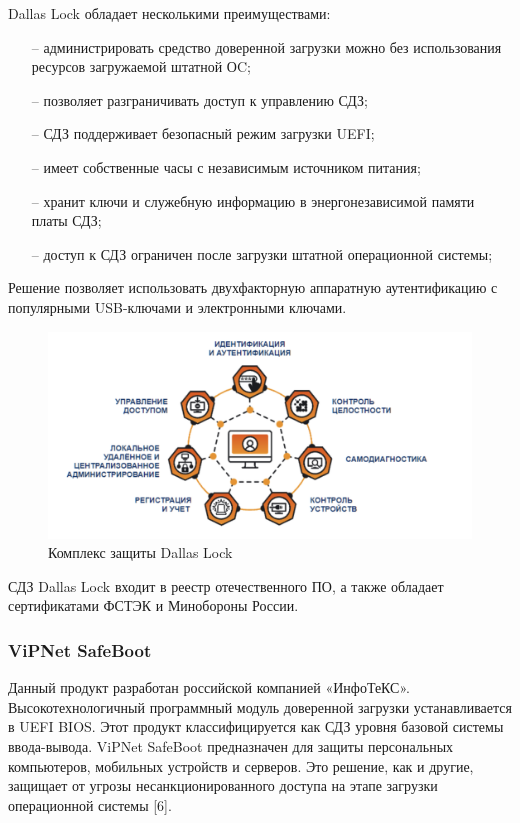 Dallas Lock обладает несколькими преимуществами:
\begin{itemize}
  \item[--] администрировать средство доверенной загрузки можно без использования ресурсов загружаемой штатной ОC;
  \item[--] позволяет разграничивать доступ к управлению СДЗ;
  \item[--] СДЗ поддерживает безопасный режим загрузки UEFI;
  \item[--] имеет собственные часы с независимым источником питания;
  \item[--] хранит ключи и служебную информацию в энергонезависимой памяти платы СДЗ;
  \item[--] доступ к СДЗ ограничен после загрузки штатной операционной системы;
\end{itemize}

Решение позволяет использовать двухфакторную аппаратную аутентификацию с популярными USB-ключами и электронными ключами.
\begin{figure}[H]
  \centering
  \includegraphics[width=1\textwidth]{pict/12}
  \caption{Комплекс защиты Dallas Lock}
  \label{fig:58}
\end{figure}

СДЗ Dallas Lock входит в реестр отечественного ПО, а также обладает сертификатами ФСТЭК и Минобороны России.

\subsubsection{ViPNet SafeBoot}

Данный продукт разработан российской компанией «ИнфоТеКС». Высокотехнологичный 
программный модуль доверенной загрузки устанавливается в UEFI BIOS. Этот продукт классифицируется как 
СДЗ уровня базовой системы ввода-вывода. ViPNet SafeBoot предназначен для защиты персональных компьютеров, 
мобильных устройств и серверов. Это решение, как и другие, защищает от угрозы несанкционированного 
доступа на этапе загрузки операционной системы [6].

